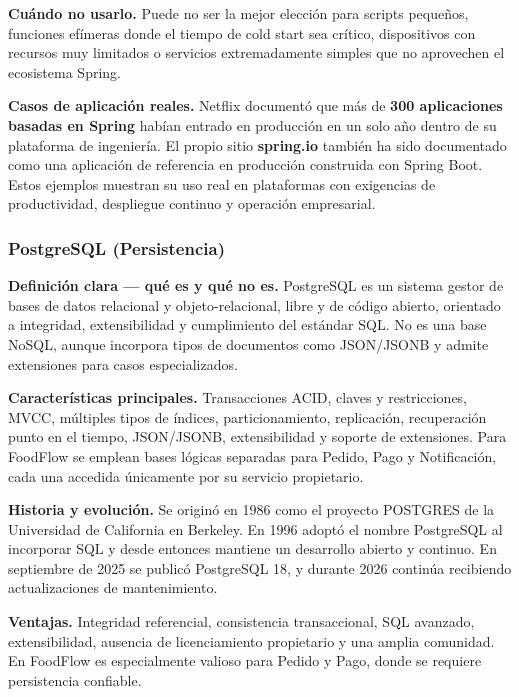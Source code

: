 \documentclass[12pt,a4paper]{article}
\begin{document}
\textbf{Cuándo no usarlo.} Puede no ser la mejor elección para scripts pequeños, funciones efímeras donde el tiempo de cold start sea crítico, dispositivos con recursos muy limitados o servicios extremadamente simples que no aprovechen el ecosistema Spring.

\textbf{Casos de aplicación reales.} Netflix documentó que más de \textbf{300 aplicaciones basadas en Spring} habían entrado en producción en un solo año dentro de su plataforma de ingeniería. El propio sitio \textbf{spring.io} también ha sido documentado como una aplicación de referencia en producción construida con Spring Boot. Estos ejemplos muestran su uso real en plataformas con exigencias de productividad, despliegue continuo y operación empresarial. \cite{spring-netflix,spring-sagan}

\subsubsection{PostgreSQL (Persistencia)}

\textbf{Definición clara --- qué es y qué no es.} PostgreSQL es un sistema gestor de bases de datos relacional y objeto-relacional, libre y de código abierto, orientado a integridad, extensibilidad y cumplimiento del estándar SQL. No es una base NoSQL, aunque incorpora tipos de documentos como JSON/JSONB y admite extensiones para casos especializados. \cite{postgres-about}

\textbf{Características principales.} Transacciones ACID, claves y restricciones, MVCC, múltiples tipos de índices, particionamiento, replicación, recuperación punto en el tiempo, JSON/JSONB, extensibilidad y soporte de extensiones. Para FoodFlow se emplean bases lógicas separadas para Pedido, Pago y Notificación, cada una accedida únicamente por su servicio propietario. \cite{postgres-about}

\textbf{Historia y evolución.} Se originó en 1986 como el proyecto POSTGRES de la Universidad de California en Berkeley. En 1996 adoptó el nombre PostgreSQL al incorporar SQL y desde entonces mantiene un desarrollo abierto y continuo. En septiembre de 2025 se publicó PostgreSQL 18, y durante 2026 continúa recibiendo actualizaciones de mantenimiento. \cite{postgres-about,postgres-release}

\textbf{Ventajas.} Integridad referencial, consistencia transaccional, SQL avanzado, extensibilidad, ausencia de licenciamiento propietario y una amplia comunidad. En FoodFlow es especialmente valioso para Pedido y Pago, donde se requiere persistencia confiable.
\end{document}
